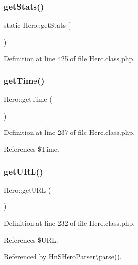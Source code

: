 \subsubsection{\texorpdfstring{get\+Stats()}{getStats()}}
{\footnotesize\ttfamily static Hero\+::get\+Stats (\begin{DoxyParamCaption}{ }\end{DoxyParamCaption})\hspace{0.3cm}{\ttfamily [static]}}



Definition at line 425 of file Hero.\+class.\+php.

\mbox{\label{class_hero_af13ab8207e0342d40d20aee7e9dc1b94}} 
\subsubsection{\texorpdfstring{get\+Time()}{getTime()}}
{\footnotesize\ttfamily Hero\+::get\+Time (\begin{DoxyParamCaption}{ }\end{DoxyParamCaption})}



Definition at line 237 of file Hero.\+class.\+php.



References \$\+Time.

\mbox{\label{class_hero_a4e52b2f4e896ade773b1cedac0857f4e}} 
\subsubsection{\texorpdfstring{get\+U\+R\+L()}{getURL()}}
{\footnotesize\ttfamily Hero\+::get\+U\+RL (\begin{DoxyParamCaption}{ }\end{DoxyParamCaption})}



Definition at line 232 of file Hero.\+class.\+php.



References \$\+U\+RL.



Referenced by Hn\+S\+Hero\+Parser\textbackslash{}parse().

